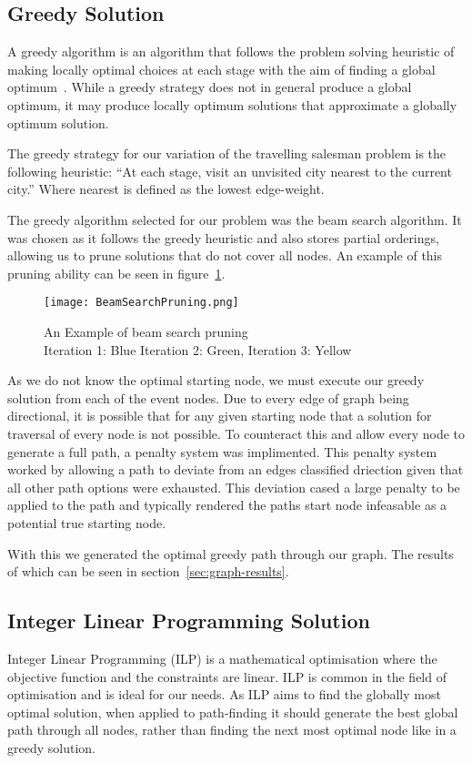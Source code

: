 \documentclass[bsc,frontabs,twoside,singlespacing,parskip,deptreport]{infthesis}     %
\begin{document}
\subsection{Greedy Solution}
A greedy algorithm is an algorithm that follows the problem solving heuristic of making locally optimal choices at each stage with the aim
of finding a global optimum~\cite{black2004dictionary}.
While a greedy strategy does not in general produce a global optimum, it may produce locally optimum solutions that approximate a globally optimum solution.


The greedy strategy for our variation of the travelling salesman problem is the following heuristic:
``At each stage, visit an unvisited city nearest to the current city.''
Where nearest is defined as the lowest edge-weight.


The greedy algorithm selected for our problem was the beam search algorithm.
It was chosen as it follows the greedy heuristic and also stores partial orderings,
allowing us to prune solutions that do not cover all nodes.
An example of this pruning ability can be seen in figure~\ref{fig:beam-prune}.

\begin{figure}
  \centering
  \texttt{[image: BeamSearchPruning.png]}
  \caption{An Example of beam search pruning\\ Iteration 1: Blue Iteration 2: Green, Iteration 3: Yellow}
  \label{fig:beam-prune}
\end{figure}

As we do not know the optimal starting node, we must execute our greedy solution from each of the event nodes.
Due to every edge of graph being directional, it is possible that for any given starting node that a solution for traversal
of every node is not possible. To counteract this and allow every node to generate a full path, a penalty system was implimented.
This penalty system worked by allowing a path to deviate from an edges classified driection given that all other path options
were exhausted. This deviation cased a large penalty to be applied to the path and typically rendered the paths start node
infeasable as a potential true starting node. 

With this we generated the optimal greedy path through our graph. The results of which can be seen in section~\ref{sec:graph-results}.

\subsection{Integer Linear Programming Solution}
Integer Linear Programming (ILP) is a mathematical optimisation where the objective function and the constraints are linear.
ILP is common in the field of optimisation and is ideal for our needs. As ILP aims to find the globally most optimal solution, when applied to path-finding it
should generate the best global path through all nodes, rather than finding the next most optimal node like in a greedy solution.
\end{document}
